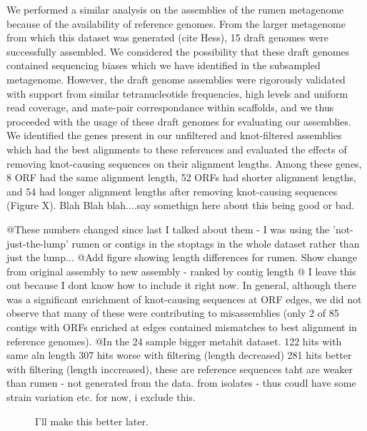 \documentclass[11pt]{article} %
\begin{document}
	We performed a similar analysis on the assemblies of the rumen metagenome because of the availability of reference genomes.  From the larger metagenome from which this dataset was generated (cite Hess), 15 draft genomes were successfully assembled.  We considered the possibility that these draft genomes contained sequencing biases which we have identified in the subsampled metagenome.  However, the draft genome assemblies were rigorously validated with support from similar tetranucleotide frequencies, high levels and uniform read coverage, and mate-pair correspondance within scaffolds, and we thus proceeded with the usage of these draft genomes for evaluating our assemblies.  We identified the genes present in our unfiltered and knot-filtered assemblies which had the best alignments to these references and evaluated the effects of removing knot-causing sequences on their alignment lengths.  Among these genes, 8 ORF had the same alignment length, 52 ORFs had shorter alignment lengths, and 54 had longer alignment lengths after removing knot-causing sequences (Figure X).   Blah Blah blah....say somethign here about this being good or bad.  
  

@These numbers changed since last I talked about them - I was using the 'not-just-the-lump' rumen or contigs in the stoptags in the whole dataset rather than just the lump...
@Add figure showing length differences for rumen.  Show change from original assembly to new assembly - ranked by contig length
@ I leave this out because I dont know how to include it right now.  In general, although there was a significant enrichment of knot-causing sequences at ORF edges, we did not observe that many of these were contributing to misassemblies (only 2 of 85 contigs with ORFs enriched at edges contained mismatches to best alignment in reference genomes).  
@In the 24 sample bigger metahit dataset. 122 hits with same aln length 307 hits worse with filtering (length decreased) 281 hits better with filtering (length inccreased), these are reference sequences taht are weaker than rumen - not generated from the data.  from isolates - thus coudl have some strain variation etc.  for now, i exclude this.


\begin{figure}
\caption{I'll make this better later.}
\end{figure}
\end{document}

